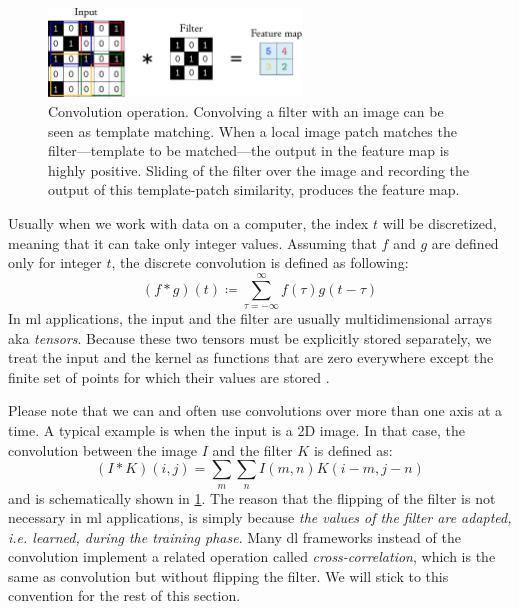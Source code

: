 \begin{figure}
	\centering
	\includegraphics[width=0.6\textwidth]{fig/convolution.pdf}
	\caption[Convolution operation.]{Convolution operation. Convolving a filter
	with an image can be seen as template matching. When a local image patch
	matches the filter—template to be matched—the output in the feature map is
	highly positive. Sliding of the filter over the image and recording the
	output of this template-patch similarity, produces the feature
	map.}
	\label{fig:convolution}
\end{figure}

Usually when we work with data on a computer, the index $t$ will be discretized,
meaning that it can take only integer values. Assuming that $f$ and $g$ are
defined only for integer $t$, the discrete convolution is defined as following:
\begin{equation}
	(f*g)(t) \coloneqq \sum_{\tau=-\infty}^{\infty} f(\tau)g(t - \tau)
\end{equation}
In \gls{ml} applications, the input and the filter are usually multidimensional
arrays aka \emph{tensors}. Because these two tensors must be explicitly stored
separately, we treat the input and the kernel as functions that are zero
everywhere except the finite set of points for which their values are
stored \parencite{deeplearning}.

Please note that we can and often use convolutions over more than one axis at a
time. A typical example is when the input is a 2D image. In that case, the
convolution between the image $I$ and the filter
$K$ is defined as:
\begin{equation}
	(I*K)(i, j) = \sum_m \sum_n I(m, n)K(i-m, j-n)
\end{equation}
and is schematically shown in \Figure{} \ref{fig:convolution}. The reason that
the flipping of the filter is not necessary in \gls{ml} applications, is simply
because \emph{the values of the filter are adapted, i.e. learned, during the
training phase}. Many \gls{dl} frameworks instead of the convolution implement a
related operation called \emph{cross-correlation}, which is the same as
convolution but without flipping the filter. We will stick to this convention
for the rest of this section.

